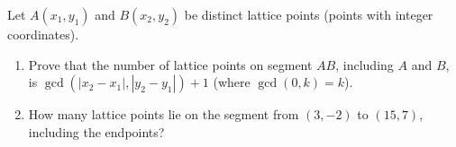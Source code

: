 Let $A(x_1,y_1)$ and $B(x_2,y_2)$ be distinct lattice points (points with integer coordinates).
\begin{enumerate}
\item[(a)] Prove that the number of lattice points on segment $AB$, including $A$ and $B$, is $\gcd\left(|x_2-x_1|,|y_2-y_1|\right)+1$ (where $\gcd(0,k)=k$).
\item[(b)] How many lattice points lie on the segment from $(3,-2)$ to $(15,7)$, including the endpoints?
\end{enumerate}
